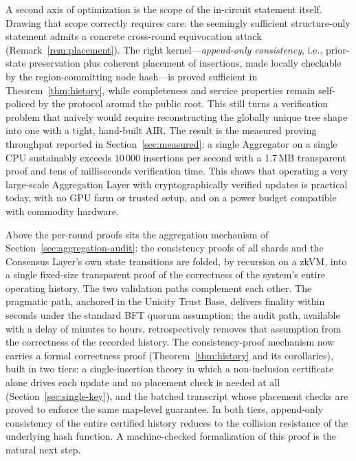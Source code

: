 \documentclass[11pt]{article}
\begin{document}
A second axis of optimization is the scope of the in-circuit statement itself. Drawing that scope correctly requires care: the seemingly sufficient structure-only statement admits a concrete cross-round equivocation attack (Remark~\ref{rem:placement}). The right kernel---\emph{append-only consistency}, i.e., prior-state preservation plus coherent placement of insertions, made locally checkable by the region-committing node hash---is proved sufficient in Theorem~\ref{thm:history}, while completeness and service properties remain self-policed by the protocol around the public root. This still turns a verification problem that naively would require reconstructing the globally unique tree shape into one with a tight, hand-built AIR. The result is the measured proving throughput reported in Section~\ref{sec:measured}: a single Aggregator on a single CPU sustainably exceeds $10\,000$ insertions per second with a 1.7\,MB transparent proof and tens of milliseconds verification time. This shows that operating a very large-scale Aggregation Layer with cryptographically verified updates is practical today, with no GPU farm or trusted setup, and on a power budget compatible with commodity hardware.

Above the per-round proofs sits the aggregation mechanism of Section~\ref{sec:aggregation-audit}: the consistency proofs of all shards and the Consensus Layer's own state transitions are folded, by recursion on a zkVM, into a single fixed-size transparent proof of the correctness of the system's entire operating history. The two validation paths complement each other. The pragmatic path, anchored in the Unicity Trust Base, delivers finality within seconds under the standard BFT quorum assumption; the audit path, available with a delay of minutes to hours, retrospectively removes that assumption from the correctness of the recorded history. The consistency-proof mechanism now carries a formal correctness proof (Theorem~\ref{thm:history} and its corollaries), built in two tiers: a single-insertion theory in which a non-inclusion certificate alone drives each update and no placement check is needed at all (Section~\ref{sec:single-key}), and the batched transcript whose placement checks are proved to enforce the same map-level guarantee. In both tiers, append-only consistency of the entire certified history reduces to the collision resistance of the underlying hash function. A machine-checked formalization of this proof is the natural next step.



\end{document}

